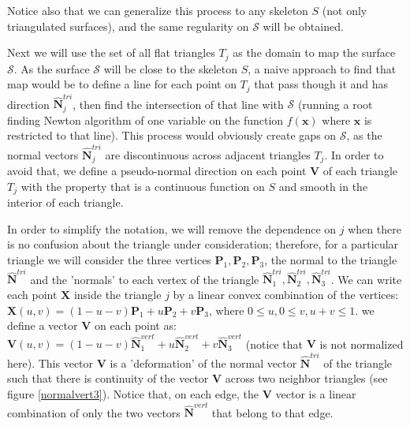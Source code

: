 \documentclass[11pt]{article}
\newcommand\bx{\boldsymbol x}
\newcommand\bP{\boldsymbol P}
\newcommand\bN{\boldsymbol N}
\newcommand\bX{\boldsymbol X}
\newcommand\bV{\boldsymbol V}
\begin{document}
Notice also that we can generalize this process to any skeleton
$\mathit{S}$ (not only triangulated surfaces), and the same regularity
on $\mathcal{S}$ will be obtained.









Next we will use the set of all flat triangles $\mathit{T}_j$ as the
domain to map the surface $\mathcal{S}$. As the surface $\mathcal{S}$
will be close to the skeleton $\mathit{S}$, a naive approach to find
that map would be to define a line for each point on $\mathit{T}_j$
that pass though it and has direction $\hat{\bN}^{tri}_j$, then find
the intersection of that line with $\mathcal{S}$ (running a root
finding Newton algorithm of one variable on the function $f(\bx)$
where $\bx$ is restricted to that line). This process would obviously
create gaps on $\mathcal{S}$, as the normal vectors
$\hat{\bN}^{tri}_j$ are discontinuous across adjacent triangles
$\mathit{T}_j$. In order to avoid that, we define a pseudo-normal
direction on each point $\bV$ of each triangle $\mathit{T}_j$ with the
property that is a continuous function on $\mathit{S}$ and smooth in
the interior of each triangle.




In order to simplify the notation, we will remove the dependence on
$j$ when there is no confusion about the triangle under consideration;
therefore, for a particular triangle we will consider the three
vertices $\bP_1,\bP_2,\bP_3$, the normal to the triangle
$\hat{\bN}^{tri}$ and the 'normals' to each vertex of the triangle
$\hat{\bN}_1^{tri},\hat{\bN}_2^{tri},\hat{\bN}_3^{tri}$. We can write
each point $\bX$ inside the triangle $j$ by a linear convex
combination of the vertices: $\bX(u,v)=(1-u-v)\bP_1+u\bP_2+v\bP_3$,
where $0\le u, 0\le v, u+v\le1$. we define a vector $\bV$ on each
point as:
$\bV(u,v)=(1-u-v)\hat{\bN}_1^{vert}+u\hat{\bN}_2^{vert}+v\hat{\bN}_3^{vert}$
(notice that $\bV$ is not normalized here). This vector $\bV$ is a
'deformation' of the normal vector $\hat{\bN}^{tri}$ of the triangle
such that there is continuity of the vector $\bV$ across two neighbor
triangles (see figure \ref{normalvert3}). Notice that, on each edge,
the $\bV$ vector is a linear combination of only the two vectors
$\hat{\bN}^{vert}$ that belong to that edge.
\end{document}
